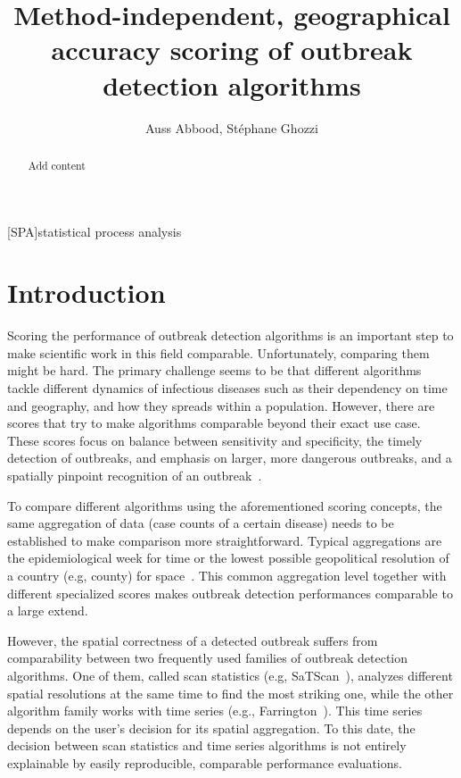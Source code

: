\documentclass[a4paper, 12pt, one column]{article}
\title{Method-independent, geographical accuracy scoring of outbreak detection algorithms}
\author{Auss Abbood, Stéphane Ghozzi}
\begin{document}
\begin{acronym}
    [SPA]{statistical process analysis}
\end{acronym}

\maketitle

\begin{abstract}
Add content
\end{abstract}

\section{Introduction}

Scoring the performance of outbreak detection algorithms is an important step to make scientific work in this field comparable. Unfortunately, comparing them might be hard. The primary challenge seems to be that different algorithms tackle different dynamics of infectious diseases such as their dependency on time and geography, and how they spreads within a population. However, there are scores that try to make algorithms comparable beyond their exact use case. These scores focus on balance between sensitivity and specificity, the timely detection of outbreaks, and emphasis on larger, more dangerous outbreaks, and a spatially pinpoint recognition of an outbreak~\citep{Enki2016, Noufaily2019}. 

To compare different algorithms using the aforementioned scoring concepts, the same aggregation of data (case counts of a certain disease) needs to be established to make comparison more straightforward. Typical aggregations are the epidemiological week for time or the lowest possible geopolitical resolution of a country (e.g, county) for space~\citep{Allevius2019}. This common aggregation level together with different specialized scores makes outbreak detection performances comparable to a large extend. 

However, the spatial correctness of a detected outbreak suffers from comparability between two frequently used families of outbreak detection algorithms. One of them, called scan statistics (e.g, SaTScan~\citep{Kulldorff2005}), analyzes different spatial resolutions at the same time to find the most striking one, while the other algorithm family works with time series (e.g., Farrington~\citep{Noufaily2013}). This time series depends on the user's decision for its spatial aggregation. To this date, the decision between scan statistics and time series algorithms is not entirely explainable by easily reproducible, comparable performance evaluations. 
\end{document}
